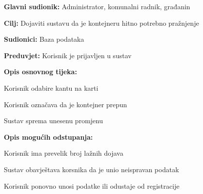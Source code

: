 				
				
				
					\noindent {}
					\begin{packed_item}
	
						\item \textbf{Glavni sudionik: }Administrator, komunalni radnik, građanin
						\item  \textbf{Cilj:} Dojaviti sustavu da je kontejneru hitno potrebno pražnjenje
						\item  \textbf{Sudionici:} Baza podataka
						\item  \textbf{Preduvjet:} Korisnik je prijavljen u sustav
						\item  \textbf{Opis osnovnog tijeka:}
						
						\item[] \begin{packed_enum}
	
							\item Korisnik odabire kantu na karti
							\item Korisnik označava da je kontejner prepun
							\item Sustav sprema unesenu promjenu
							
						\end{packed_enum}
						
						\item  \textbf{Opis mogućih odstupanja:}
						
						\item[] \begin{packed_item}
	
							\item[2.a] Korisnik ima prevelik broj lažnih dojava
							
							\item[] \begin{packed_enum}
								
								\item Sustav obavještava korsnika da je unio neispravan podatak
								\item Korisnik ponovno unosi podatke ili odustaje od registracije
								
							
							\end{packed_enum}
							
						\end{packed_item}
					\end{packed_item}

				
				

